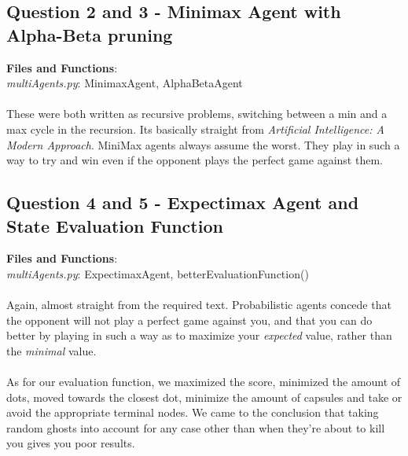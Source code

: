 \documentclass[]{article}
\begin{document}
\subsection{Question 2 and 3 - Minimax Agent with Alpha-Beta pruning}

\textbf{Files and Functions}: \\
\emph{multiAgents.py}: MinimaxAgent, AlphaBetaAgent

\paragraph{}

These were both written as recursive problems, switching between a min and a max cycle in the recursion. Its basically straight from \emph{Artificial Intelligence: A Modern Approach}. MiniMax agents always assume the worst. They play in such a way to try and win even if the opponent plays the perfect game against them. 

\subsection{Question 4 and 5 - Expectimax Agent and State Evaluation Function}

\textbf{Files and Functions}: \\
\emph{multiAgents.py}: ExpectimaxAgent, betterEvaluationFunction()

\paragraph{}

Again, almost straight from the required text. Probabilistic agents concede that the opponent will not play a perfect game against you, and that you can do better by playing in such a way as to maximize your \emph{expected} value, rather than the \emph{minimal} value.

\paragraph{}

As for our evaluation function, we maximized the score, minimized the amount of dots, moved towards the closest dot, minimize the amount of capsules and take or avoid the appropriate terminal nodes. We came to the conclusion that taking random ghosts into account for any case other than when they're about to kill you gives you poor results.

\pagebreak
\end{document}
